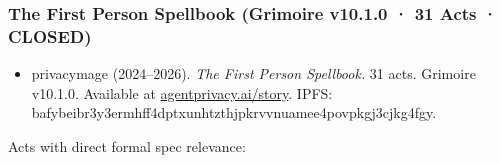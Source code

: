 \documentclass[
  11pt,
]{article}
\providecommand{\tightlist}{%
  \setlength{\itemsep}{0pt}\setlength{\parskip}{0pt}}
\begin{document}
\subsubsection{The First Person Spellbook (Grimoire v10.1.0 · 31 Acts ·
CLOSED)}\label{the-first-person-spellbook-grimoire-v10.1.0-31-acts-closed}

\begin{itemize}
\tightlist
\item
  privacymage (2024--2026). \emph{The First Person Spellbook.} 31 acts.
  Grimoire v10.1.0. Available at
  \href{https://agentprivacy.ai/story}{agentprivacy.ai/story}. IPFS:
  bafybeibr3y3ermhff4dptxunhtzthjpkrvvnuamee4povpkgj3cjkg4fgy.
\end{itemize}

Acts with direct formal spec relevance:
\end{document}

